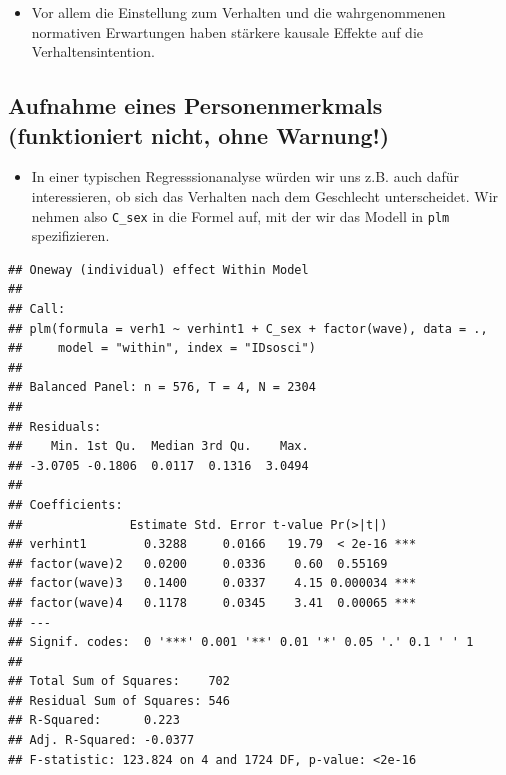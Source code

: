 \documentclass[
]{book}
\newenvironment{Shaded}{\begin{snugshade}}{\end{snugshade}}
\newcommand{\DataTypeTok}[1]{\textcolor[rgb]{0.13,0.29,0.53}{#1}}
\newcommand{\KeywordTok}[1]{\textcolor[rgb]{0.13,0.29,0.53}{\textbf{#1}}}
\newcommand{\NormalTok}[1]{#1}
\newcommand{\OperatorTok}[1]{\textcolor[rgb]{0.81,0.36,0.00}{\textbf{#1}}}
\newcommand{\StringTok}[1]{\textcolor[rgb]{0.31,0.60,0.02}{#1}}
\providecommand{\tightlist}{%
  \setlength{\itemsep}{0pt}\setlength{\parskip}{0pt}}
\begin{document}
\begin{itemize}
\tightlist
\item
  Vor allem die Einstellung zum Verhalten und die wahrgenommenen normativen Erwartungen haben stärkere kausale Effekte auf die Verhaltensintention.
\end{itemize}

\hypertarget{aufnahme-eines-personenmerkmals-funktioniert-nicht-ohne-warnung}{%
\subsection*{Aufnahme eines Personenmerkmals (funktioniert nicht, ohne Warnung!)}\label{aufnahme-eines-personenmerkmals-funktioniert-nicht-ohne-warnung}}

\begin{itemize}
\tightlist
\item
  In einer typischen Regresssionanalyse würden wir uns z.B. auch dafür interessieren, ob sich das Verhalten nach dem Geschlecht unterscheidet. Wir nehmen also \texttt{C\_sex} in die Formel auf, mit der wir das Modell in \texttt{plm} spezifizieren.
\end{itemize}

\begin{Shaded}
\end{Shaded}

\begin{verbatim}
## Oneway (individual) effect Within Model
## 
## Call:
## plm(formula = verh1 ~ verhint1 + C_sex + factor(wave), data = ., 
##     model = "within", index = "IDsosci")
## 
## Balanced Panel: n = 576, T = 4, N = 2304
## 
## Residuals:
##    Min. 1st Qu.  Median 3rd Qu.    Max. 
## -3.0705 -0.1806  0.0117  0.1316  3.0494 
## 
## Coefficients:
##               Estimate Std. Error t-value Pr(>|t|)    
## verhint1        0.3288     0.0166   19.79  < 2e-16 ***
## factor(wave)2   0.0200     0.0336    0.60  0.55169    
## factor(wave)3   0.1400     0.0337    4.15 0.000034 ***
## factor(wave)4   0.1178     0.0345    3.41  0.00065 ***
## ---
## Signif. codes:  0 '***' 0.001 '**' 0.01 '*' 0.05 '.' 0.1 ' ' 1
## 
## Total Sum of Squares:    702
## Residual Sum of Squares: 546
## R-Squared:      0.223
## Adj. R-Squared: -0.0377
## F-statistic: 123.824 on 4 and 1724 DF, p-value: <2e-16
\end{verbatim}
\end{document}
